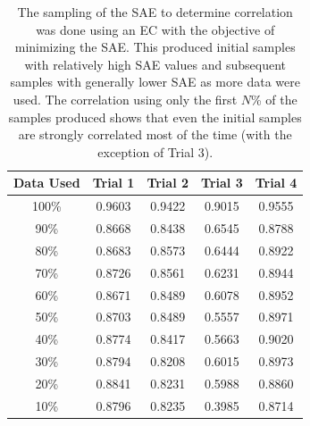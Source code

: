 \documentclass[preprint, review, 12pt]{elsarticle}
\begin{document}
\begin{table}[htbp]
\centering
\caption{The sampling of the SAE to determine correlation was done using an EC with the objective of minimizing the SAE. This produced initial samples with relatively high SAE values and subsequent samples with generally lower SAE as more data were used. The correlation using only the first $N$\% of the samples produced shows that even the initial samples are strongly correlated most of the time (with the exception of Trial 3).}
\label{tab:hour-corr}
\begin{tabular}{ccccc}
\toprule
Data Used & Trial 1 & Trial 2 & Trial 3 & Trial 4\\
\midrule
100\% & 0.9603 & 0.9422 & 0.9015 & 0.9555\\\rowcolor{DarkRow}
90\%  & 0.8668 & 0.8438 & 0.6545 & 0.8788\\
80\%  & 0.8683 & 0.8573 & 0.6444 & 0.8922\\\rowcolor{DarkRow}
70\%  & 0.8726 & 0.8561 & 0.6231 & 0.8944\\
60\%  & 0.8671 & 0.8489 & 0.6078 & 0.8952\\\rowcolor{DarkRow}
50\%  & 0.8703 & 0.8489 & 0.5557 & 0.8971\\
40\%  & 0.8774 & 0.8417 & 0.5663 & 0.9020\\\rowcolor{DarkRow}
30\%  & 0.8794 & 0.8208 & 0.6015 & 0.8973\\
20\%  & 0.8841 & 0.8231 & 0.5988 & 0.8860\\\rowcolor{DarkRow}
10\%  & 0.8796 & 0.8235 & 0.3985 & 0.8714\\
\bottomrule
\end{tabular}
\end{table}
\end{document}
